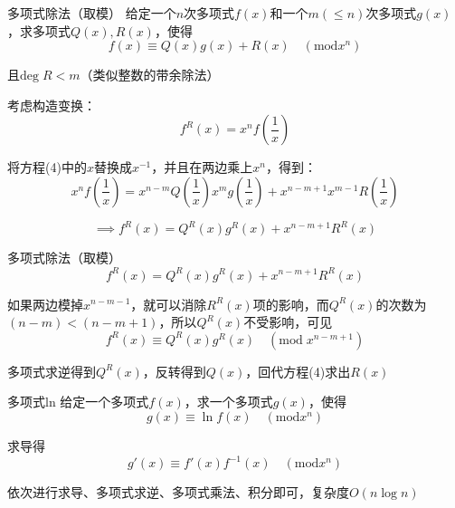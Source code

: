 \documentclass{beamer}
\begin{document}
\begin{frame}{多项式除法（取模）}
    \small
    给定一个$n$次多项式$f(x)$和一个$m(\leq n)$次多项式$g(x)$，求多项式$Q(x),R(x)$，使得
    \begin{equation}
        f(x) \equiv Q(x)g(x)+R(x) \quad (\text{mod} x^n)
    \end{equation}

    且$\text{deg}\;R<m$（类似整数的带余除法）

    \vspace{1em}\pause
    考虑构造变换：
    \begin{equation*}
        f^R(x)=x^{n}f\left(\frac{1}{x}\right)
    \end{equation*}

    \pause
    将方程(4)中的$x$替换成$x^{-1}$，并且在两边乘上$x^n$，得到：
    \begin{equation*}
        x^nf\left(\frac{1}{x}\right)=x^{n-m}Q\left(\frac{1}{x}\right)x^m g\left(\frac{1}{x}\right) + x^{n-m+1}x^{m-1}R\left(\frac{1}{x}\right)
    \end{equation*}

    \pause
    \begin{equation*}
        \implies f^R(x) = Q^R(x)g^R(x)+x^{n-m+1}R^R(x)
    \end{equation*}
\end{frame}

\begin{frame}{多项式除法（取模）}
    \small
    \begin{equation*}
        f^R(x) = Q^R(x)g^R(x)+x^{n-m+1}R^R(x)
    \end{equation*}

    如果两边模掉$x^{n-m-1}$，就可以消除$R^R(x)$项的影响，而$Q^R(x)$的次数为$(n-m)<(n-m+1)$，所以$Q^R(x)$不受影响\pause，可见
    \begin{equation*}
        f^R(x)\equiv Q^R(x)g^R(x)\quad (\text{mod}\; x^{n-m+1})
    \end{equation*}

    多项式求逆得到$Q^R(x)$，反转得到$Q(x)$，回代方程(4)求出$R(x)$
\end{frame}

\begin{frame}{多项式ln}
    \small
    给定一个多项式$f(x)$，求一个多项式$g(x)$，使得
    \begin{equation}
        g(x) \equiv \ln f(x) \quad (\text{mod} x^n)
    \end{equation}
    
    \vspace{1em}\pause
    求导得
    \begin{equation*}
        g'(x) \equiv f'(x)f^{-1}(x) \quad (\text{mod} x^n)
    \end{equation*}

    依次进行求导、多项式求逆、多项式乘法、积分即可，复杂度$O(n\log n)$
\end{frame}
\end{document}
